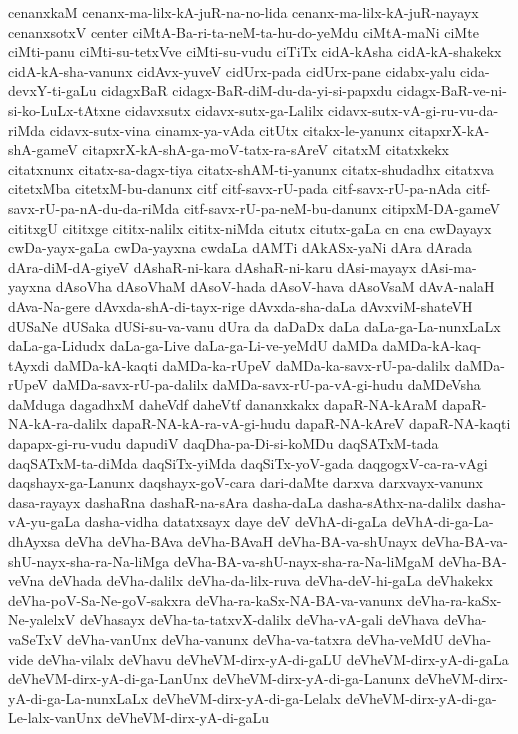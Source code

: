 {cenanxkaM
cenanx-ma-lilx-kA-juR-na-no-lida
cenanx-ma-lilx-kA-juR-nayayx
cenanxsotxV
center
ciMtA-Ba-ri-ta-neM-ta-hu-do-yeMdu
ciMtA-maNi
ciMte
ciMti-panu
ciMti-su-tetxVve
ciMti-su-vudu
ciTiTx
cidA-kAsha
cidA-kA-shakekx
cidA-kA-sha-vanunx
cidAvx-yuveV
cidUrx-pada
cidUrx-pane
cidabx-yalu
cida-devxY-ti-gaLu
cidagxBaR
cidagx-BaR-diM-du-da-yi-si-papxdu
cidagx-BaR-ve-ni-si-ko-LuLx-tAtxne
cidavxsutx
cidavx-sutx-ga-Lalilx
cidavx-sutx-vA-gi-ru-vu-da-riMda
cidavx-sutx-vina
cinamx-ya-vAda
citUtx
citakx-le-yanunx
citapxrX-kA-shA-gameV
citapxrX-kA-shA-ga-moV-tatx-ra-sAreV
citatxM
citatxkekx
citatxnunx
citatx-sa-dagx-tiya
citatx-shAM-ti-yanunx
citatx-shudadhx
citatxva
citetxMba
citetxM-bu-danunx
citf
citf-savx-rU-pada
citf-savx-rU-pa-nAda
citf-savx-rU-pa-nA-du-da-riMda
citf-savx-rU-pa-neM-bu-danunx
citipxM-DA-gameV
cititxgU
cititxge
cititx-nalilx
cititx-niMda
citutx
citutx-gaLa
cn
cna
cwDayayx
cwDa-yayx-gaLa
cwDa-yayxna
cwdaLa
dAMTi
dAkASx-yaNi
dAra
dArada
dAra-diM-dA-giyeV
dAshaR-ni-kara
dAshaR-ni-karu
dAsi-mayayx
dAsi-ma-yayxna
dAsoVha
dAsoVhaM
dAsoV-hada
dAsoV-hava
dAsoVsaM
dAvA-nalaH
dAva-Na-gere
dAvxda-shA-di-tayx-rige
dAvxda-sha-daLa
dAvxviM-shateVH
dUSaNe
dUSaka
dUSi-su-va-vanu
dUra
da
daDaDx
daLa
daLa-ga-La-nunxLaLx
daLa-ga-Lidudx
daLa-ga-Live
daLa-ga-Li-ve-yeMdU
daMDa
daMDa-kA-kaq-tAyxdi
daMDa-kA-kaqti
daMDa-ka-rUpeV
daMDa-ka-savx-rU-pa-dalilx
daMDa-rUpeV
daMDa-savx-rU-pa-dalilx
daMDa-savx-rU-pa-vA-gi-hudu
daMDeVsha
daMduga
dagadhxM
daheVdf
daheVtf
dananxkakx
dapaR-NA-kAraM
dapaR-NA-kA-ra-dalilx
dapaR-NA-kA-ra-vA-gi-hudu
dapaR-NA-kAreV
dapaR-NA-kaqti
dapapx-gi-ru-vudu
dapudiV
daqDha-pa-Di-si-koMDu
daqSATxM-tada
daqSATxM-ta-diMda
daqSiTx-yiMda
daqSiTx-yoV-gada
daqgogxV-ca-ra-vAgi
daqshayx-ga-Lanunx
daqshayx-goV-cara
dari-daMte
darxva
darxvayx-vanunx
dasa-rayayx
dashaRna
dashaR-na-sAra
dasha-daLa
dasha-sAthx-na-dalilx
dasha-vA-yu-gaLa
dasha-vidha
datatxsayx
daye
deV
deVhA-di-gaLa
deVhA-di-ga-La-dhAyxsa
deVha
deVha-BAva
deVha-BAvaH
deVha-BA-va-shUnayx
deVha-BA-va-shU-nayx-sha-ra-Na-liMga
deVha-BA-va-shU-nayx-sha-ra-Na-liMgaM
deVha-BA-veVna
deVhada
deVha-dalilx
deVha-da-lilx-ruva
deVha-deV-hi-gaLa
deVhakekx
deVha-poV-Sa-Ne-goV-sakxra
deVha-ra-kaSx-NA-BA-va-vanunx
deVha-ra-kaSx-Ne-yalelxV
deVhasayx
deVha-ta-tatxvX-dalilx
deVha-vA-gali
deVhava
deVha-vaSeTxV
deVha-vanUnx
deVha-vanunx
deVha-va-tatxra
deVha-veMdU
deVha-vide
deVha-vilalx
deVhavu
deVheVM-dirx-yA-di-gaLU
deVheVM-dirx-yA-di-gaLa
deVheVM-dirx-yA-di-ga-LanUnx
deVheVM-dirx-yA-di-ga-Lanunx
deVheVM-dirx-yA-di-ga-La-nunxLaLx
deVheVM-dirx-yA-di-ga-Lelalx
deVheVM-dirx-yA-di-ga-Le-lalx-vanUnx
deVheVM-dirx-yA-di-gaLu
}
